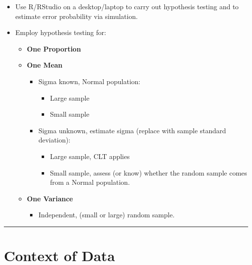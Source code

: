 \documentclass[oneside,openany]{book}
\providecommand{\tightlist}{%
  \setlength{\itemsep}{0pt}\setlength{\parskip}{0pt}}
\begin{document}
\begin{itemize}
\tightlist
\item
  Use R/RStudio on a desktop/laptop to carry out hypothesis testing and to estimate error probability via simulation.
\item
  Employ hypothesis testing for:

  \begin{itemize}
  \tightlist
  \item
    \textbf{One Proportion}
  \item
    \textbf{One Mean}

    \begin{itemize}
    \tightlist
    \item
      Sigma known, Normal population:

      \begin{itemize}
      \tightlist
      \item
        Large sample
      \item
        Small sample
      \end{itemize}
    \item
      Sigma unknown, estimate sigma (replace with sample standard deviation):

      \begin{itemize}
      \tightlist
      \item
        Large sample, CLT applies
      \item
        Small sample, assess (or know) whether the random sample comes from a Normal population.
      \end{itemize}
    \end{itemize}
  \item
    \textbf{One Variance}

    \begin{itemize}
    \tightlist
    \item
      Independent, (small or large) random sample.
    \end{itemize}
  \end{itemize}
\end{itemize}

\begin{center}\rule{0.5\linewidth}{0.5pt}\end{center}

\section{Context of Data}\label{context-of-data}
\end{document}
